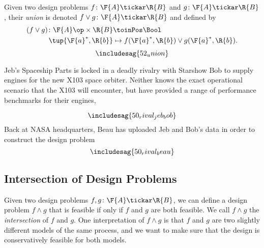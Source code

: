 \begin{definition}
Given two design problems $f \colon \F{A} \tickar \R{B}$ and $g \colon \F{A} \tickar \R{B}$, their \emph{union} is denoted $f \vee g \colon \F{A} \tickar \R{B}$ and defined by
\begin{equation}
\begin{aligned}
(f \vee g)\colon \F{A}\op \times \R{B} & \toinPos \Bool \\
\tup{\F{a}^*, \R{b}} & \mapsto f(\F{a}^*, \R{b}) \vee g(\F{a}^*, \R{b}).
\end{aligned}
\end{equation}
\begin{equation}
    \includesag{52_union}
\end{equation}
\end{definition}

\begin{example}
Jeb's Spaceship Parts is locked in a deadly rivalry with Starshow Bob to supply engines for the new X103 space orbiter. Neither knows the exact operational scenario that the X103 will encounter, but have provided a range of performance benchmarks for their engines,
\begin{comment}
\[
    \centering
    \includesag{50_rival_jeb}
    \quad
        \includesag{50_rival_bob}
\]
\end{comment}
\[
\includesag{50_rival_jeb_bob}
\]
Back at NASA headquarters, Beau has uploaded Jeb and Bob's data in order to construct the design problem
\[
      \includesag{50_rival_beau}
\]
\end{example}


\subsection{Intersection of Design Problems}
Given two design problems $f, g \colon \F{A} \tickar \R{B}$, we can define a design problem $f \wedge g$ that is feasible if only if $f$ and $g$ are both feasible. We call $f \wedge g$ the \emph{intersection} of $f$ and $g$. One interpretation of $f \wedge g$ is that $f$ and $g$ are two slightly different models of the same process, and we want to make sure that the design is conservatively feasible for both models.

